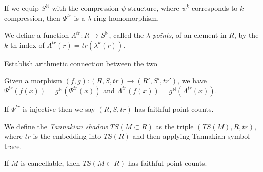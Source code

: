 \begin{proposition}
  If we equip $S^{\mathbb{N}}$ with the compression-$\psi$ structure, where $\psi^k$ corresponds to $k$-compression, then $\Psi^{tr}$ is a $\lambda$-ring homomorphism.
\end{proposition}

\begin{definition}
    We define a function $\Lambda^{tr} : R \to S^{\mathbb{N}}$, called the \emph{$\lambda$-points}, of an element in $R$, by the $k$-th index of $\Lambda^{tr}(r) = tr(\lambda^k(r))$. 
\end{definition}

\begin{proposition} 
  Establish arithmetic connection between the two
\end{proposition}

\begin{proposition}
  Given a morphism $(f, g) : (R, S, tr) \to (R', S', tr')$, we have $\Psi^{tr}(f(x)) = g^{\mathbb{N}}(\Psi^{tr}(x))$ and $\Lambda^{tr}(f(x)) = g^{\mathbb{N}}(\Lambda^{tr}(x))$.
\end{proposition}

\begin{definition}
  If $\Psi^{tr}$ is injective then we say $(R, S, tr)$ has faithful point counts. 
\end{definition}

\begin{definition}
  We define the \emph{Tannakian shadow} $TS(M \subset R)$ as the triple $(TS(M), R, tr)$, where $tr$ is the embedding into $TS(R)$ and then applying Tannakian symbol trace. 
\end{definition}

\begin{proposition}
  If $M$ is cancellable, then $TS(M \subset R)$ has faithful point counts. 
\end{proposition}
